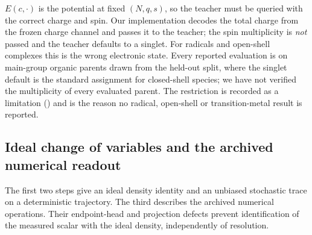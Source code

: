 \begin{assumption}
\label{ass:charge}
$E(c,\cdot)$ is the potential at fixed $(N,q,s)$, so the teacher must be queried
with the correct charge and spin. Our implementation decodes the total charge from
the frozen charge channel and passes it to the teacher; the spin multiplicity is
\emph{not} passed and the teacher defaults to a singlet. For radicals and
open-shell complexes this is the wrong electronic state. Every reported evaluation
is on main-group organic parents drawn from the held-out split, where the singlet
default is the standard assignment for closed-shell species; we have not verified
the multiplicity of every evaluated parent. The restriction is recorded as a
limitation () and is the reason no radical, open-shell or
transition-metal result is reported.
\end{assumption}

\subsection{Ideal change of variables and the archived numerical readout}
\label{app:density}

The first two steps give an ideal density identity and an unbiased stochastic
trace on a deterministic trajectory. The third describes the archived numerical
operations. Their endpoint-head and projection defects prevent identification of
the measured scalar with the ideal density, independently of resolution.

